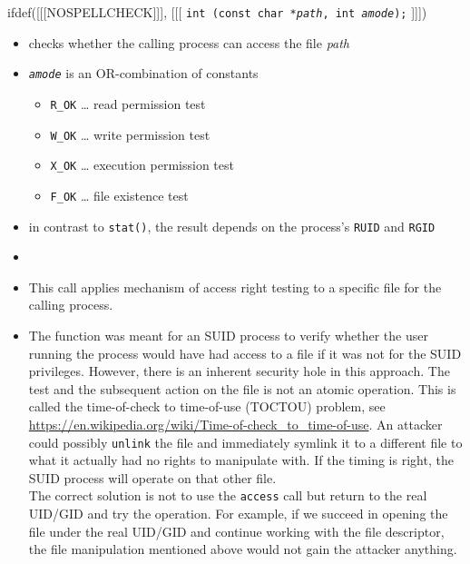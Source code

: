 

\begin{slide}
ifdef([[[NOSPELLCHECK]]], [[[
\texttt{int (const char *\emph{path}, int \emph{amode});}
]]])
\begin{itemize}
\item checks whether the calling process can access the file \emph{path}
\item \emph{\texttt{amode}} is an OR-combination of constants
    \begin{itemize}
    \item \verb#R_OK# \dots{} read permission test
    \item \verb#W_OK# \dots{} write permission test
    \item \verb#X_OK# \dots{} execution permission test
    \item \verb#F_OK# \dots{} file existence test
    \end{itemize}
\item in contrast to \texttt{stat()}, the result depends on the process's
\texttt{RUID} and \texttt{RGID}
\item {}
\end{itemize}
\end{slide}

\begin{itemize}
\item This call applies mechanism of access right testing to a specific file for
the calling process.
\item The function was meant for an SUID process to verify whether the user
running the process would have had access to a file if it was not for the SUID
privileges.  However, there is an inherent security hole in this approach.
The test and the subsequent action on the file is not an atomic operation.
This is called the time-of-check to time-of-use (TOCTOU) problem,
see \url{https://en.wikipedia.org/wiki/Time-of-check\_to\_time-of-use}.
An attacker could possibly \texttt{unlink} the file and immediately symlink it
to a different file to what it actually had no rights to manipulate with.
If the timing is right, the SUID process will operate on that other file.
\\
The correct solution is not to use the \texttt{access} call but return to the
real UID/GID and try the operation.  For example, if we succeed in opening the
file under the real UID/GID and continue working with the file descriptor, the
file manipulation mentioned above would not gain the attacker anything.
\end{itemize}

